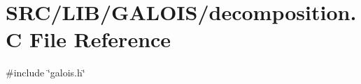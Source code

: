 \hypertarget{_g_a_l_o_i_s_2decomposition_8_c}{}\section{S\+R\+C/\+L\+I\+B/\+G\+A\+L\+O\+I\+S/decomposition.C File Reference}
\label{_g_a_l_o_i_s_2decomposition_8_c}
{\ttfamily \#include \char`\"{}galois.\+h\char`\"{}}\newline
